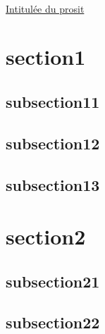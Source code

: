 \documentclass{article}
\begin{document}
\paragraph{}
\paragraph{}

\tableofcontents
\raggedright

\paragraph{}

\href{reference}{\color{blue}Intitulée du prosit}


\color{red}
\section{
section1
}
\color{blue}
\subsection{
subsection11
}
\color{black}


\lipsum[100]


\color{blue}
\subsection{
subsection12
}
\color{black}

\lipsum[100]

\color{blue}
\subsection{
subsection13
}
\color{black}

\lipsum[100]

\color{red}
\section{
section2
}
\color{blue}
\subsection{
subsection21
}


\color{black}


\lipsum[100]


\color{blue}
\subsection{
subsection22
}
\color{black}
\end{document}
